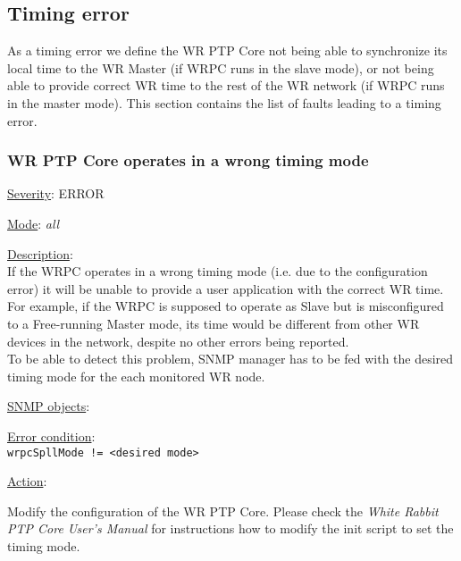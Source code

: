 \newpage
\subsection{Timing error}
\label{sec:timing_fail}
As a timing error we define the WR PTP Core not being able to synchronize its
local time to the WR Master (if WRPC runs in the slave mode), or not being able
to provide correct WR time to the rest of the WR network (if WRPC runs in the
master mode). This section contains the list of faults leading to a timing error.

\subsubsection{\bf WR PTP Core operates in a wrong timing mode}
    \label{fail:timing:ppsi_wrong_mode}
    \begin{pck_descr}
			\item [] \underline{Severity}: ERROR
			\item [] \underline{Mode}: \emph{all}
			\item [] \underline{Description}:\\
        If the WRPC operates in a wrong timing mode (i.e. due to the
        configuration error) it will be unable to provide a user application
        with the correct WR time. For example, if the WRPC is supposed to
        operate as Slave but is misconfigured to a Free-running Master mode, its
        time would be different from other WR devices in the network, despite no
        other errors being reported.\\
        To be able to detect this problem, SNMP manager has to be fed with the
        desired timing mode for the each monitored WR node.
			\item [] \underline{SNMP objects}:\\
        {\footnotesize
         }
			\item [] \underline{Error condition}:\\
        {\footnotesize
        \texttt{wrpcSpllMode != <desired mode>}}
      \item [] \underline{Action}:
        \begin{pck_proc}
        \item Modify the configuration of the WR PTP Core. Please check the
          \emph{White Rabbit PTP Core User's Manual} for instructions how to
          modify the init script to set the timing mode.
        \end{pck_proc}
    \end{pck_descr}

